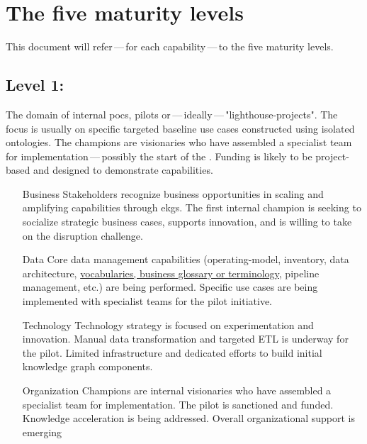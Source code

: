 \section{The five maturity levels}\label{sec:the-five-maturity-levels}

This document will refer\,---\,for each capability\,---\,to the five maturity levels.

\subsection{Level 1: \ekgmmLevelOneLabel}

The domain of internal \glspl{poc}, pilots or\,---\,ideally\,---\,"\glspl{lighthouse-project}".
The focus is usually on specific targeted baseline use cases constructed using isolated ontologies.
The champions are visionaries who have assembled a specialist team for implementation\,---\,possibly the
start of the .
Funding is likely to be project-based and designed to demonstrate capabilities.

\begin{itemize}[leftmargin=1in,font=\bfseries]

    \item[Business]     Stakeholders recognize business opportunities in scaling and amplifying capabilities
                        through \glspl{ekg}.
                        The first internal champion is seeking to socialize strategic business cases,
                        supports innovation, and is willing to take on the disruption challenge.
    \item[Data]         Core data management capabilities (\gls{operating-model}, inventory, data architecture,
                        \hyperref[sec:ekg-mm-vocabularies]{vocabularies, business glossary or terminology},
                        pipeline management, etc.) are being performed.
                        Specific use cases are being implemented with specialist teams for the pilot initiative.
    \item[Technology]   Technology strategy is focused on experimentation and innovation.
                        Manual data transformation and targeted ETL is underway for the pilot.
                        Limited infrastructure and dedicated efforts to build initial knowledge graph components.
    \item[Organization] Champions are internal visionaries who have assembled a specialist team for implementation.
                        The pilot is sanctioned and funded.
                        Knowledge acceleration is being addressed.
                        Overall organizational support is emerging
\end{itemize}

